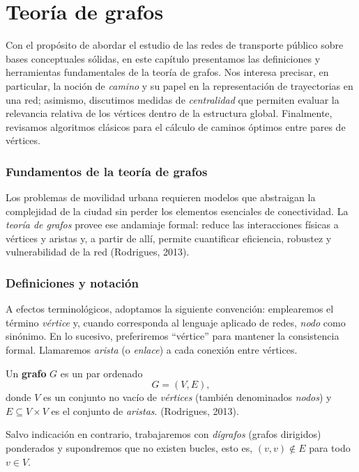 \chapter{Teoría de grafos}
    Con el propósito de abordar el estudio de las redes de transporte público sobre bases conceptuales sólidas, en este capítulo presentamos las definiciones y herramientas fundamentales de la teoría de grafos. Nos interesa precisar, en particular, la noción de \emph{camino} y su papel en la representación de trayectorias en una red; asimismo, discutimos medidas de \emph{centralidad} que permiten evaluar la relevancia relativa de los vértices dentro de la estructura global. Finalmente, revisamos algoritmos clásicos para el cálculo de caminos óptimos entre pares de vértices.

    \subsection{Fundamentos de la teoría de grafos}

    Los problemas de movilidad urbana requieren modelos que abstraigan la complejidad de la ciudad sin perder los elementos esenciales de conectividad. La \emph{teoría de grafos} provee ese andamiaje formal: reduce las interacciones físicas a vértices y aristas y, a partir de allí, permite
    cuantificar eficiencia, robustez y vulnerabilidad de la red (Rodrigues, 2013).

    \subsection{Definiciones y notación}
    A efectos terminológicos, adoptamos la siguiente convención: emplearemos el término \emph{vértice} y, cuando corresponda al lenguaje aplicado de redes, \emph{nodo} como sinónimo. En lo sucesivo, preferiremos “vértice” para mantener la consistencia formal. Llamaremos \emph{arista} (o \emph{enlace}) a cada conexión entre vértices.

    \begin{definition}
    Un \textbf{grafo} $G$ es un par ordenado
    \begin{equation}
        G = (V,E),
    \end{equation}
    donde $V$ es un conjunto no vacío de \emph{vértices} (también denominados \emph{nodos}) y $E \subseteq V\times V$ es el conjunto de \emph{aristas}. (Rodrigues, 2013).
    \end{definition}

    Salvo indicación en contrario, trabajaremos con \emph{dígrafos} (grafos dirigidos) ponderados y supondremos que no existen bucles, esto es, $(v,v) \notin E$ para todo $v\in V$.

